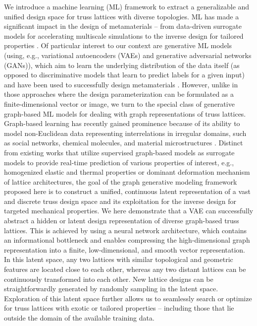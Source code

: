 \documentclass[fleqn,10pt]{wlscirep}
\begin{document}
We introduce a machine learning (ML) framework to extract a generalizable and unified design space for truss lattices with diverse topologies. ML has made a significant impact in the design of metamaterials -- from data-driven surrogate models for accelerating multiscale simulations \cite{white2019multiscale, mozaffar2019deep, vlassis2020geometric, wu2020bayesian, fuhg2021model, zheng2021data} to the inverse design for tailored properties \cite{ma2019probabilistic, chen2020generative, xue2020data, kumar2020inverse, challapalli2021inverse, wang2022inverse, bastek2022inverting}. Of particular interest to our context are generative ML models (using, e.g., variational autoencoders \cite{kingma2013auto} (VAEs) and generative adversarial networks \cite{goodfellow2020generative} (GANs)), which aim to learn the underlying distribution of the data itself (as opposed to discriminative models that learn to predict labels for a given input) and have been used to successfully design metamaterials \cite{sanchez2018inverse, liu2018generative, wang2020deep, gurbuz2021generative}. However, unlike in those approaches where the design parameterization can be formulated as a finite-dimensional vector or image, we turn to the special class of generative graph-based ML models for dealing with graph representations of truss lattices. Graph-based learning has recently gained prominence because of its ability to model non-Euclidean data representing interrelations in irregular domains, such as social networks, \cite{hamilton2017inductive,qiu2018deepinf, zhang2018link} chemical molecules, \cite{wu2018moleculenet,jin2018junction} and material microstructures \cite{vlassis2020geometric, dai2021graph}. Distinct from existing works that utilize supervised graph-based models as surrogate models to provide real-time prediction of various properties of interest, e.g., homogenized elastic \cite{ross2021using} and thermal properties \cite{meyer2022graph} or dominant deformation mechanism \cite{indurkar2022predicting} of lattice architectures, the goal of the graph generative modeling framework proposed here is to construct a unified, continuous latent representation of a vast and discrete truss design space and its exploitation for the inverse design for targeted  mechanical properties. We here demonstrate that a VAE can successfully abstract a hidden or latent design representation of diverse graph-based truss lattices. This is achieved by using a neural network architecture, which contains an informational bottleneck and enables compressing the high-dimensional graph representation into a finite, low-dimensional, and smooth vector representation. In this latent space, any two lattices with similar topological and geometric features are located close to each other, whereas any two distant lattices can be continuously transformed into each other.  New lattice designs can be  straightforwardly generated by randomly sampling in the latent space. Exploration of this latent space further allows us to seamlessly search or optimize for truss lattices with exotic or tailored properties -- including those that lie outside the domain of the available training data.
\end{document}
